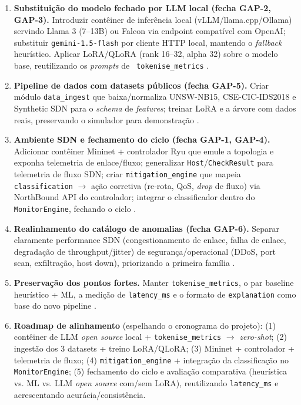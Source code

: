 \documentclass[12pt,a4paper]{article}
\begin{document}
\begin{enumerate}
  \item \textbf{Substituição do modelo fechado por LLM local (fecha GAP-2,
  GAP-3).} Introduzir contêiner de inferência local (vLLM/llama.cpp/Ollama)
  servindo Llama 3 (7--13B) ou Falcon via endpoint compatível com OpenAI;
  substituir \texttt{gemini-1.5-flash} por cliente HTTP local, mantendo o
  \textit{fallback} heurístico. Aplicar LoRA/QLoRA (rank 16--32, alpha 32)
  sobre o modelo base, reutilizando os \textit{prompts} de \texttt{
  tokenise\_metrics} \cite{rA41}\cite{rA42}\cite{rA420}\cite{rA421}.
  \item \textbf{Pipeline de dados com datasets públicos (fecha GAP-5).} Criar
  módulo \texttt{data\_ingest} que baixa/normaliza UNSW-NB15, CSE-CIC-IDS2018
  e Synthetic SDN para o \textit{schema} de \textit{features}; treinar LoRA e a
  árvore com dados reais, preservando o simulador para demonstração \cite{rA61}\cite{rA64}.
  \item \textbf{Ambiente SDN e fechamento do ciclo (fecha GAP-1, GAP-4).}
  Adicionar contêiner Mininet + controlador Ryu que emule a topologia e exponha
  telemetria de enlace/fluxo; generalizar \texttt{Host}/\texttt{CheckResult}
  para telemetria de fluxo SDN; criar \texttt{mitigation\_engine} que mapeia
  \texttt{classification} $\rightarrow$ ação corretiva (re-rota, QoS,
  \textit{drop} de fluxo) via NorthBound API do controlador; integrar o
  classificador dentro do \texttt{MonitorEngine}, fechando o ciclo \cite{rA14}\cite{rA116}\cite{rA133}.
  \item \textbf{Realinhamento do catálogo de anomalias (fecha GAP-6).}
  Separar claramente performance SDN (congestionamento de enlace, falha de
  enlace, degradação de throughput/jitter) de segurança/operacional (DDoS, port
  scan, exfiltração, host down), priorizando a primeira família \cite{rA512}.
  \item \textbf{Preservação dos pontos fortes.} Manter \texttt{tokenise\_metrics},
  o par baseline heurístico + ML, a medição de \texttt{latency\_ms} e o formato
  de \texttt{explanation} como base do novo pipeline \cite{rA616}\cite{rA431}.
  \item \textbf{Roadmap de alinhamento} (espelhando o cronograma do projeto):
  (1) contêiner de LLM \textit{open source} local + \texttt{tokenise\_metrics}
  $\rightarrow$ \textit{zero-shot}; (2) ingestão dos 3 datasets + treino
  LoRA/QLoRA; (3) Mininet + controlador + telemetria de fluxo; (4)
  \texttt{mitigation\_engine} + integração da classificação no
  \texttt{MonitorEngine}; (5) fechamento do ciclo e avaliação comparativa
  (heurística vs. ML vs. LLM \textit{open source} com/sem LoRA), reutilizando
  \texttt{latency\_ms} e acrescentando acurácia/consistência.
\end{enumerate}
\end{document}
